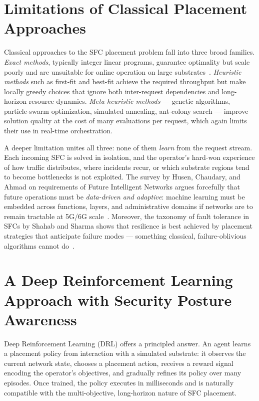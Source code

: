 \section{Limitations of Classical Placement Approaches}

Classical approaches to the SFC placement problem fall into three broad
families. \textit{Exact methods}, typically integer linear programs,
guarantee optimality but scale poorly and are unsuitable for online
operation on large
substrates~\cite{santos_service_2021}. \textit{Heuristic methods} such
as first-fit and best-fit achieve the required throughput but make
locally greedy choices that ignore both inter-request dependencies and
long-horizon resource dynamics. \textit{Meta-heuristic methods} ---
genetic algorithms, particle-swarm optimization, simulated annealing,
ant-colony search --- improve solution quality at the cost of many
evaluations per request, which again limits their use in real-time
orchestration.

A deeper limitation unites all three: none of them \emph{learn} from
the request stream. Each incoming SFC is solved in isolation, and the
operator's hard-won experience of how traffic distributes, where
incidents recur, or which substrate regions tend to become bottlenecks
is not exploited. The survey by Husen, Chaudary, and Ahmad on
requirements of Future Intelligent Networks argues forcefully that
future operations must be \textit{data-driven and adaptive}: machine
learning must be embedded across functions, layers, and administrative
domains if networks are to remain tractable at 5G/6G
scale~\cite{husen_survey_2022}. Moreover, the taxonomy of fault
tolerance in SFCs by Shahab and Sharma shows that resilience is best
achieved by placement strategies that anticipate failure modes ---
something classical, failure-oblivious algorithms
cannot do~\cite{shahab_fault_2025}.

\section{A Deep Reinforcement Learning Approach with Security Posture Awareness}

Deep Reinforcement Learning (DRL) offers a principled answer. An agent
learns a placement policy from interaction with a simulated substrate:
it observes the current network state, chooses a placement action,
receives a reward signal encoding the operator's objectives, and
gradually refines its policy over many episodes. Once trained, the
policy executes in milliseconds and is naturally compatible with the
multi-objective, long-horizon nature of SFC placement.

